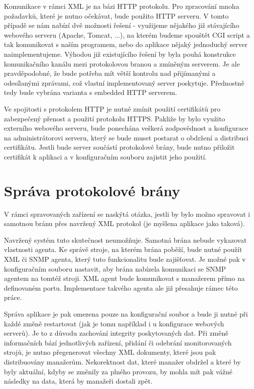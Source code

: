 Komunikace v rámci XML je na bázi HTTP protokolu. Pro zpracování mnoha požadavků, které je nutno očekávat, bude použito HTTP serveru. V tomto případě se nám nabízí dvě možnosti
řešení - využijeme nějakého již stávajícího webového serveru (Apache, Tomcat, ...), na kterém budeme spouštět CGI script a tak komunikovat s naším programem, nebo do aplikace nějaký jednoduchý server
naimplementujeme. Výhodou již existujícího řešení by byla pouhá konstrukce komunikačního kanálu mezi protokolovou branou a zmíněným serverem. Je ale pravděpodobné, že bude potřeba mít větší kontrolu
nad přijímanými a odesílanými zprávami, což vlastní implementovaný server poskytuje. Přednostně tedy bude vybrána varianta s embedded HTTP serverem.

Ve spojitosti s protokolem HTTP je nutné zmínit použití certifikátů pro zabezpečený přenost a použití protokolu HTTPS. Pakliže by bylo využito externího webového serveru, bude ponechána
veškerá zodpovědnost a konfigurace na administrátorovi serveru, který se bude muset postarat o obdržení a distribuci certifikátu. Jestli bude server součástí protokolové brány, bude
nutno přiložit certifikát k aplikaci a v konfiguračním souboru zajistit jeho použití.

\section{Správa protokolové brány}
V rámci spravovaných zařízení se naskýtá otázka, jestli by bylo možno spravovat i samotnou bránu přes navržený XML protokol (je myšlena aplikace jako taková). 

Navržený systém tuto skutečnost neumožňuje. Samotná brána nebude vykazovat vlastnosti agenta. Ke správě stroje, na kterém brána poběží, bude nutné použít XML či SNMP agenta, který tuto 
funkcionalitu bude zajišťovat. Je možné pak v konfiguračním souboru nastavit, aby brána nabízela komunikaci se SNMP agentem na tomtéž stroji. XML agent bude komunikovat s manažerem přímo na definovaném portu.
Implementace takvého agenta ale již přesahuje rámec této práce.

Správa aplikace je pak omezena pouze na konfigurační soubor a bude ji nutné při každé změně restartovat (jak je tomu například i u konfigurace webových serverů). Je to z důvodu zachování integrity poskytovaných dat.
Při změně informačních bází jednotlivých zařízení, přidání či odebrání monitorovaných strojů, je nutno přegenerovat všechny XML dokumenty, které jsou pak distribuovány manažerům. Nekorektnost dat, které manažer obdržel a které
by byly aktuální, kdyby se změnily za plného provozu, by mohla mít pak vážné následky na data, která by manažeři dostali zpět.

